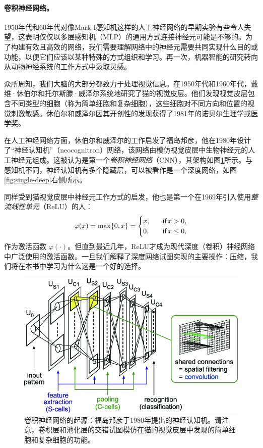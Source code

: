 \documentclass[../../book-main.tex]{subfiles}
\begin{document}
\paragraph{卷积神经网络。}
1950年代和60年代对像Mark I感知机这样的人工神经网络的早期实验有些令人失望，这表明仅仅以多层感知机（MLP）的通用方式连接神经元可能是不够的。为了构建有效且高效的网络，我们需要理解网络中的神经元需要共同实现什么目的或功能，以便它们应该以某种特殊的方式组织和学习。再一次，机器智能的研究转向从动物神经系统的工作方式中汲取灵感。

众所周知，我们大脑的大部分都致力于处理视觉信息。在1950年代和1960年代，戴维·休伯尔和托尔斯滕·威泽尔系统地研究了猫的视觉皮层。他们发现视觉皮层包含不同类型的细胞（称为简单细胞和复杂细胞），这些细胞对不同方向和位置的视觉刺激敏感\cite{Hubel-Wiesel-1959}。休伯尔和威泽尔因其开创性的发现获得了1981年的诺贝尔生理学或医学奖。


在人工神经网络方面，休伯尔和威泽尔的工作启发了福岛邦彦，他在1980年设计了“神经认知机”（neocognitron）网络，该网络由模仿视觉皮层中生物神经元的人工神经元组成\cite{Fukushima1980NeocognitronAS}。这被认为是第一个{\em 卷积神经网络}（CNN），其架构如图\ref{fig:neocognitron}所示。与感知机不同，神经认知机有多个隐藏层，可以被看作是一个深度网络，如图\ref{fig:single-deep}右侧所示。

同样受到猫视觉皮层中神经元工作方式的启发，他也是第一个在1969年引入使用{\em 整流线性单元}（ReLU）的人\cite{Fukushima-1969}：
\begin{equation}
    \varphi(x) = \max\{0, x\} = \begin{cases}x, & \text{if} \, x > 0, \\ 0, \quad & \text{if} \, x \leq 0,\end{cases}
\end{equation}
作为激活函数 $\varphi(\cdot)$。但直到最近几年，ReLU才成为现代深度（卷积）神经网络中广泛使用的激活函数。一旦我们解释了深度网络试图实现的主要操作：压缩，我们将在本书中学习为什么这是一个好的选择。

\begin{figure}
    \centering
    \includegraphics[width=0.6\linewidth]{figures/neocognitron.png}
    \caption{卷积神经网络的起源：福岛邦彦于1980年提出的神经认知机。请注意，卷积层和池化层的交错试图模仿在猫的视觉皮层中发现的简单细胞和复杂细胞的功能。}
    \label{fig:neocognitron}
\end{figure}
\end{document}
